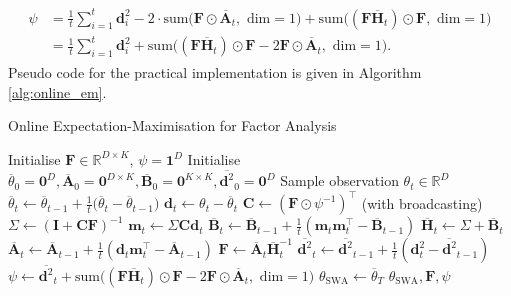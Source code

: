 \documentclass[msc,deptreport.inf]{infthesis} %
\newcommand{\matr}[1]{\mathbf{#1}}
\newcommand{\R}{\mathbb R}
\begin{document}
\begin{align}
\begin{split}\label{eqn:em_Psi_efficient_update}
	\psi 
	& = \frac{1}{t} \sum_{i=1}^t \matr{d}_i^2 
	- 2 \cdot \text{sum} \big(\matr{F} \odot \overline{\matr{A}}_t, \text{ dim} = 1\big)
	+ \text{sum}\big((\matr{F} \overline{\matr{H}}_t) \odot \matr{F}, \text{ dim} = 1\big) \\	
	& = \frac{1}{t} \sum_{i=1}^t \matr{d}_i^2 
	+ \text{sum} \big((\matr{F} \overline{\matr{H}}_t) \odot \matr{F} -2\matr{F} \odot \overline{\matr{A}}_t , \text{ dim} = 1\big).
\end{split}
\end{align}
Pseudo code for the practical implementation is given in Algorithm \ref{alg:online_em}. 

\begin{algorithm}[!htbp] 
	\caption{Online Expectation-Maximisation for Factor Analysis}
	\label{alg:online_em}
	\begin{algorithmic}[1]
		\State Initialise $\matr{F} \in \R^{D \times K}$, $\psi = \matr{1}^D$
		\State Initialise $\overline{\theta}_0 = \matr{0}^D, \overline{\matr{A}}_0 = \matr{0}^{D \times K}, 
			\overline{\matr{B}}_0 = \matr{0}^{K \times K}, \overline{\matr{d}^2}_0 = \matr{0}^D$
			\State Sample observation $\theta_t \in \R^D$
			\State
				$\overline{\theta}_t \leftarrow  \overline{\theta}_{t-1} + \frac{1}{t}\big(\overline{\theta}_t - \overline{\theta}_{t-1}\big)$
			\State $\matr{d}_t \leftarrow \theta_t - \overline{\theta}_t$
			\State $\matr{C} \leftarrow (\matr{F} \odot \psi^{-1})^\intercal$ (with broadcasting)
			\State $\Sigma \leftarrow (\matr{I} + \matr{C} \matr{F})^{-1}$ 
			\State $\matr{m}_t \leftarrow \Sigma \matr{C} \matr{d}_t$ 
			\State $\overline{\matr{B}}_t \leftarrow \overline{\matr{B}}_{t-1} + \frac{1}{t} (\matr{m}_t \matr{m}_t^\intercal - \overline{\matr{B}}_{t-1})$
			\State $\overline{\matr{H}}_t \leftarrow \Sigma + \overline{\matr{B}}_t$
			\State $\overline{\matr{A}}_t \leftarrow \overline{\matr{A}}_{t-1} + \frac{1}{t} (\matr{d}_t \matr{m}_t^\intercal - \overline{\matr{A}}_{t-1})$
			\State $\matr{F} \leftarrow \overline{\matr{A}}_t \overline{\matr{H}}_t^{-1}$
			\State $\overline{\matr{d}^2}_t \leftarrow \overline{\matr{d}^2}_{t-1} + \frac{1}{t} (\matr{d}_t^2 - \overline{\matr{d}^2}_{t-1})$
			\State $\psi \leftarrow 
				\overline{\matr{d}^2}_t
	+ \text{sum} \big((\matr{F} \overline{\matr{H}}_t) \odot \matr{F} -2\matr{F} \odot \overline{\matr{A}}_t , \text{ dim} = 1\big)$
		\EndFor
		\State $\theta_{\text{SWA}} \leftarrow \overline{\theta}_T$
		\State \Return $\theta_{\text{SWA}}, \matr{F}, \psi$
	\end{algorithmic}
\end{algorithm}
\end{document}
